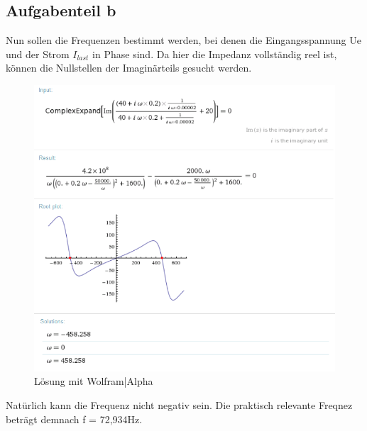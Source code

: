 \documentclass[%
  a4paper, %
  12pt, %
   article, %
  titlepage
]{scrartcl}
\begin{document}
\clearpage

\subsection{Aufgabenteil b}
Nun sollen die Frequenzen bestimmt werden, bei denen die Eingangsspannung Ue
und der Strom $I_{last}$ in Phase sind. Da hier die Impedanz vollständig reel ist, können die Nullstellen der Imaginärteils gesucht werden.

\begin{figure}[h]
\includegraphics[width=\textwidth]{wolfram3.png}
\caption{Lösung mit Wolfram|Alpha}
\label{fig5}
\end{figure}

Natürlich kann die Frequenz nicht negativ sein. Die praktisch relevante Freqnez beträgt demnach f = 72,934Hz.
\end{document}
